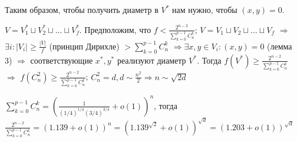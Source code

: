Таким образом, чтобы получить диаметр в $V^*$ нам нужно, чтобы $(x, y) = 0$.

$V = V_1^* \sqcup V_2^* \sqcup \dots \sqcup V_f^*$. Предположим, что $f < \frac{2^{n-2}}{\sum_{k=0}^{p-1} C_n^k}$; $V = V_1 \sqcup V_2 \sqcup \dots \sqcup V_f$ $\Rightarrow$ $\exists i : |V_i| \geqslant \frac{|V|}{f}$ (принцип Дирихле) $ > \sum_{k=0}^{p-1} C_n^k$ $\Rightarrow \exists x, y \in V_i: (x, y) = 0$ (лемма 3) $ \Rightarrow $ соответствующие $x^*, y^*$ реализуют диаметр $V^*$. Тогда $f(V^*) \geqslant \frac{2^{n-2}}{\sum_{k=0}^{p-1} C_n^k}$ $\Rightarrow$ $f(C_n^2) \geqslant \frac{2^{n-2}}{\sum_{k=0}^{p-1} C_n^k}$; $C_n^2 = d, d \sim \frac{n^2}{2} \Rightarrow n \sim \sqrt{2d}$

$\sum_{k=0}^{p-1} C_n^k = (\frac{1}{(1/4)^{1/4}(3/4)^{3/4}} + o(1))^n$, тогда $\frac{2^{n-2}}{\sum_{k=0}^{p-1} C_n^k} = (1.139 + o(1))^n = (1.139^{\sqrt{2}} + o(1))^{\sqrt{d}} = (1.203 + o(1))^{\sqrt{d}}$
\EndProof